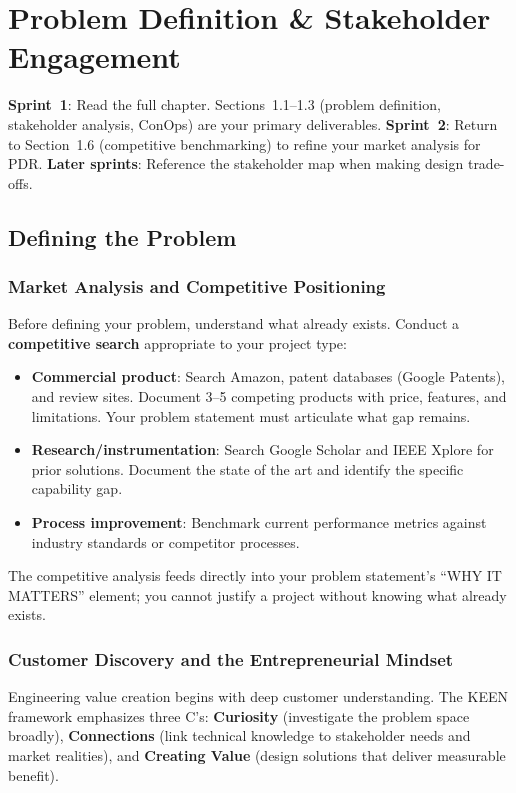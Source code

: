 \chapter{Problem Definition \& Stakeholder Engagement}\label{ch:problem}

\begin{tipbox}
\textbf{Sprint~1}: Read the full chapter. Sections~1.1--1.3 (problem definition, stakeholder analysis, ConOps) are your primary deliverables. \textbf{Sprint~2}: Return to Section~1.6 (competitive benchmarking) to refine your market analysis for PDR. \textbf{Later sprints}: Reference the stakeholder map when making design trade-offs.
\end{tipbox}

\vspace{1em}


\vspace{1em}

\section{Defining the Problem}
\subsection{Market Analysis and Competitive Positioning}
Before defining your problem, understand what already exists. Conduct a \textbf{competitive search} appropriate to your project type:

\begin{itemize}[leftmargin=1.5em]
\item \textbf{Commercial product}: Search Amazon, patent databases (Google Patents), and review sites. Document 3--5 competing products with price, features, and limitations. Your problem statement must articulate what gap remains.
\item \textbf{Research/instrumentation}: Search Google Scholar and IEEE Xplore for prior solutions. Document the state of the art and identify the specific capability gap.
\item \textbf{Process improvement}: Benchmark current performance metrics against industry standards or competitor processes.
\end{itemize}

The competitive analysis feeds directly into your problem statement's ``WHY IT MATTERS'' element; you cannot justify a project without knowing what already exists.

\subsection{Customer Discovery and the Entrepreneurial Mindset}
Engineering value creation begins with deep customer understanding. The KEEN framework emphasizes three C's: \textbf{Curiosity} (investigate the problem space broadly), \textbf{Connections} (link technical knowledge to stakeholder needs and market realities), and \textbf{Creating Value} (design solutions that deliver measurable benefit).


